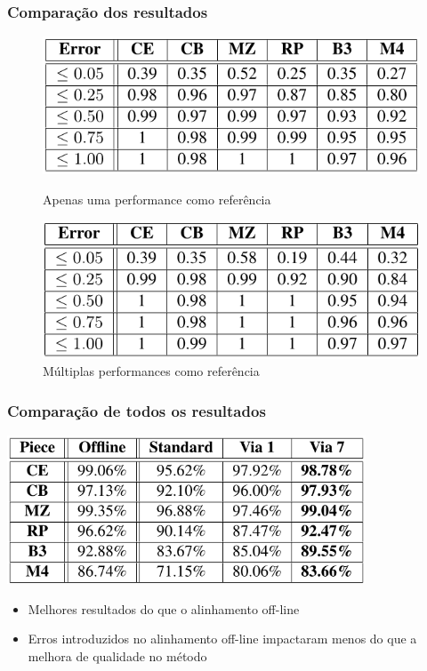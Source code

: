 \begin{frame}
  \frametitle{Comparação dos resultados}

  \begin{figure}[!tbp]
    \centering
    \begin{minipage}[b]{0.45\textwidth}
      \includegraphics[width=\textwidth]{src/img/3-Table4-1.png}
      \caption*{Apenas uma performance como referência}
    \end{minipage}
    \hfill
    \begin{minipage}[b]{0.45\textwidth}
      \includegraphics[width=\textwidth]{src/img/3-Table5-1.png}
      \caption*{Múltiplas performances como referência}
    \end{minipage}
  \end{figure}
\end{frame}

\begin{frame}
  \frametitle{Comparação de todos os resultados}
  \begin{center}
    \includegraphics[width=0.8\textwidth]{src/img/4-Table6-1.png}
  \end{center}
  \begin{itemize}
    \item Melhores resultados do que o alinhamento off-line\pause
    \item Erros introduzidos no alinhamento off-line impactaram menos do que a melhora de qualidade no método
  \end{itemize}
\end{frame}
